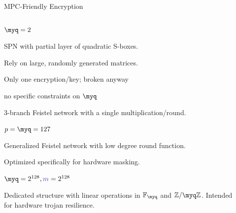 \documentclass[presentation,aspectratio=1610]{beamer}
\begin{document}
\begin{frame}{MPC-Friendly Encryption}
  \begin{columns}
    \begin{column}{0.7\textwidth}
      \begin{description}
        \setlength\itemsep{0.2cm}
      \item<1->[LowMC] \cite{EC:ARSTZ15} $\myq = 2$ 

        {\small SPN with partial layer of quadratic S-boxes.

          Rely on large, randomly generated  matrices.

        Only one encryption/key; broken anyway}
          
    \item<2->[Ciminion] \cite{EC:DGGK21} no specific constraints on $\myq$

      {\small 3-branch Feistel network with a single
        multiplication/round.}
          
    \item<3->[small-pSquare] \cite{EPRINT:GMMMS24} $p = \myq = 127$

      {\small Generalized Feistel network with low degree round function.

        Optimized specifically for hardware masking.}
      
    \item<4->[MOE] \cite{ToSC:BFLLPS21} $\myq = 2^{128}, {\color{blue}m}=2^{128}$

      {\small Dedicated structure with linear operations in $\mathbb{F}_\myq$ and $\Zmod{\myq}$. Intended for hardware trojan resilience.}
      \end{description}
    \end{column}
    \hfill
    \begin{column}{0.28\textwidth}
    \end{column}
  \end{columns}
\end{frame}
\end{document}
